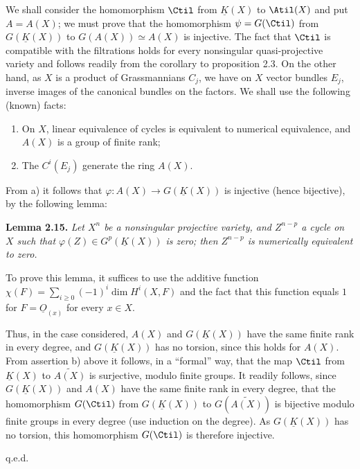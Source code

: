 We shall consider the homomorphism $\Ctil$ from $\underline K(X)$ to $\Atil(X)$ and put $A=A(X)$; we must prove that the homomorphism $\psi=G(\Ctil)$ from $G(\underline K(X))$ to $G(A(X))\simeq A(X)$ is injective. The fact that $\Ctil$ is compatible with the filtrations holds for every nonsingular quasi-projective variety and follows readily from the corollary to proposition 2.3. On the other hand, as $X$ is a product of Grassmannians $C_j$, we have on $X$ vector bundles $E_j$, inverse images of the canonical bundles on the factors. We shall use the following (known) facts:
\begin{enumerate}[label=\alph*)]
\item On $X$, linear equivalence of cycles is equivalent to numerical equivalence, and $A(X)$ is a group of finite rank;
\item The $C^i(E_j)$ generate the ring $A(X)$.
\end{enumerate}

From a) it follows that $\varphi:A(X)\longrightarrow G(\underline K(X))$ is injective (hence bijective), by the following lemma:

\textbf{Lemma 2.15.} \emph{Let $X^n$ be a nonsingular projective variety, and $Z^{n-p}$ a cycle on $X$ such that $\varphi(Z)\in G^p(\underline K(X))$ is zero; then $Z^{n-p}$ is numerically equivalent to zero.}

To prove this lemma, it suffices to use the additive function $\chi(F)=\sum_{i\geq0}(-1)^i\dim H^i(X,F)$ and the fact that this function equals
%
$1$
for $F=\underline{O}_{(x)}$ for every $x\in X$.

Thus, in the case considered, $A(X)$ and $G(\underline K(X))$ have the same finite rank in every degree, and $G(\underline K(X))$ has no torsion, since this holds for $A(X)$. From assertion b) above it follows, in a ``formal'' way, that the map $\Ctil$ from $\underline K(X)$ to $\widetilde{A(X)}$ is surjective, modulo finite groups. It readily follows, since $G(\underline K(X))$ and $A(X)$ have the same finite rank in every degree, that the homomorphism $G(\Ctil)$ from $G(\underline K(X))$ to $G(\widetilde{A(X)})$ is bijective modulo finite groups in every degree (use induction on the degree). As $G(\underline K(X))$ has no torsion, this homomorphism $G(\Ctil)$ is therefore injective.
\begin{flushright}q.e.d.\end{flushright}

